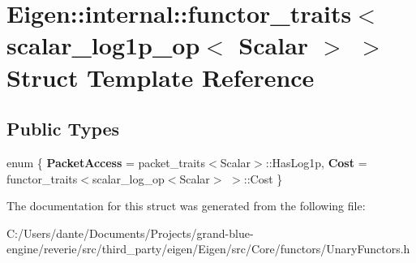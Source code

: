 \hypertarget{struct_eigen_1_1internal_1_1functor__traits_3_01scalar__log1p__op_3_01_scalar_01_4_01_4}{}\section{Eigen\+::internal\+::functor\+\_\+traits$<$ scalar\+\_\+log1p\+\_\+op$<$ Scalar $>$ $>$ Struct Template Reference}
\label{struct_eigen_1_1internal_1_1functor__traits_3_01scalar__log1p__op_3_01_scalar_01_4_01_4}
\subsection*{Public Types}
\begin{DoxyCompactItemize}
\item 
\mbox{\label{struct_eigen_1_1internal_1_1functor__traits_3_01scalar__log1p__op_3_01_scalar_01_4_01_4_adc03cf0562ae825a9b0a7be747695de9}} 
enum \{ {\bfseries Packet\+Access} = packet\+\_\+traits$<$Scalar$>$\+::Has\+Log1p, 
{\bfseries Cost} = functor\+\_\+traits$<$scalar\+\_\+log\+\_\+op$<$Scalar$>$ $>$\+::Cost
 \}
\end{DoxyCompactItemize}


The documentation for this struct was generated from the following file\+:\begin{DoxyCompactItemize}
\item 
C\+:/\+Users/dante/\+Documents/\+Projects/grand-\/blue-\/engine/reverie/src/third\+\_\+party/eigen/\+Eigen/src/\+Core/functors/Unary\+Functors.\+h\end{DoxyCompactItemize}
